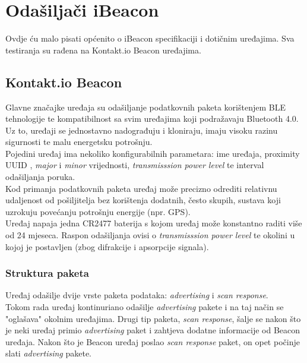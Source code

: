 \chapter{Odašiljači iBeacon}
Ovdje ću malo pisati općenito o iBeacon specifikaciji i dotičnim uređajima. Sva testiranja su rađena na Kontakt.io Beacon uređajima.

\section*{Kontakt.io Beacon}
Glavne značajke uređaja su odašiljanje podatkovnih paketa korištenjem BLE tehnologije te kompatibilnost sa svim uređajima koji podražavaju Bluetooth 4.0. 
Uz to, uređaji se jednostavno nadograđuju i kloniraju, imaju visoku razinu sigurnosti te malu energetsku potrošnju.
\\
Pojedini uređaj ima nekoliko konfigurabilnih parametara: ime uređaja, proximity UUID , \textit{major} i \textit{minor} vrijednosti, \textit{transmisssion power level} te interval odašiljanja poruka.
\\
Kod primanja podatkovnih paketa uređaj može precizno odrediti relativnu udaljenost od pošiljitelja bez korištenja dodatnih, često skupih, sustava koji uzrokuju povećanju potrošnju energije (npr. GPS).
\\
Uređaj napaja jedna CR2477 baterija s kojom uređaj može konstantno raditi više od 24 mjeseca.
Raspon odašiljanja ovisi o \textit{transmisssion power level} te okolini u kojoj je postavljen (zbog difrakcije i apsorpcije signala).

\subsection*{Struktura paketa}
Uređaj odašilje dvije vrste paketa podataka: \textit{advertising} i \textit{scan response}.
\\
Tokom rada uređaj kontinuriano odašilje \textit{advertising} pakete i na taj način se "oglašava" okolnim uređajima. Drugi tip paketa, \textit{scan response}, šalje se nakon što je neki uređaj primio \textit{advertising} paket i zahtjeva dodatne informacije od Beacon uređaja. Nakon što je Beacon uređaj poslao \textit{scan response} paket, on opet počinje slati \textit{advertising} pakete.
\\

